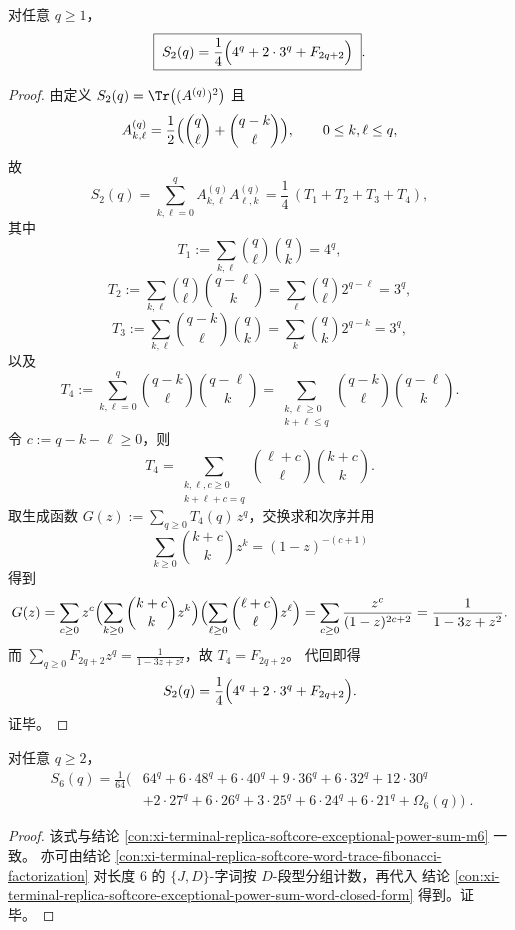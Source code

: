 \begin{corollary}[例外谱二次幂和的全闭式]\label{cor:xi-terminal-replica-softcore-exceptional-power-sum-m2-closed-form}
对任意 \(q\ge 1\)，
\[
\boxed{\;
S_2(q)=\frac14\Bigl(4^q+2\cdot3^q+F_{2q+2}\Bigr)\; }.
\]
\end{corollary}
\begin{proof}
由定义
\(
S_2(q)=\Tr\bigl((A^{(q)})^2\bigr)
\)
且
\[
A^{(q)}_{k,\ell}
=\frac12\Bigl(\binom{q}{\ell}+\binom{q-k}{\ell}\Bigr),
\qquad
0\le k,\ell\le q,
\]
故
\[
S_2(q)=\sum_{k,\ell=0}^{q}A^{(q)}_{k,\ell}A^{(q)}_{\ell,k}
=\frac14\,(T_1+T_2+T_3+T_4),
\]
其中
\[
T_1:=\sum_{k,\ell}\binom{q}{\ell}\binom{q}{k}=4^q,
\]
\[
T_2:=\sum_{k,\ell}\binom{q}{\ell}\binom{q-\ell}{k}
=\sum_{\ell}\binom{q}{\ell}2^{q-\ell}=3^q,
\]
\[
T_3:=\sum_{k,\ell}\binom{q-k}{\ell}\binom{q}{k}
=\sum_{k}\binom{q}{k}2^{q-k}=3^q,
\]
以及
\[
T_4:=\sum_{k,\ell=0}^{q}\binom{q-k}{\ell}\binom{q-\ell}{k}
=\sum_{\substack{k,\ell\ge0\\k+\ell\le q}}
\binom{q-k}{\ell}\binom{q-\ell}{k}.
\]
令 \(c:=q-k-\ell\ge0\)，则
\[
T_4
=\sum_{\substack{k,\ell,c\ge0\\k+\ell+c=q}}
\binom{\ell+c}{\ell}\binom{k+c}{k}.
\]
取生成函数 \(G(z):=\sum_{q\ge0}T_4(q)\,z^q\)，交换求和次序并用
\[
\sum_{k\ge0}\binom{k+c}{k}z^k=(1-z)^{-(c+1)}
\]
得到
\[
G(z)
=\sum_{c\ge0}z^c
\Bigl(\sum_{k\ge0}\binom{k+c}{k}z^k\Bigr)
\Bigl(\sum_{\ell\ge0}\binom{\ell+c}{\ell}z^\ell\Bigr)
=\sum_{c\ge0}\frac{z^c}{(1-z)^{2c+2}}
=\frac1{1-3z+z^2}.
\]
而
\(
\sum_{q\ge0}F_{2q+2}z^q=\frac1{1-3z+z^2}
\)，故 \(T_4=F_{2q+2}\)。
代回即得
\[
S_2(q)=\frac14\Bigl(4^q+2\cdot3^q+F_{2q+2}\Bigr).
\]
证毕。
\end{proof}

\begin{conclusion}[六次幂和的全指数展开]\label{con:xi-terminal-replica-softcore-exceptional-power-sum-m6-word-expanded}
对任意 \(q\ge 2\)，
\[
\boxed{\;
\begin{aligned}
S_6(q)=\frac1{64}\Big(
&64^{q}
+6\cdot 48^{q}
+6\cdot 40^{q}
+9\cdot 36^{q}
+6\cdot 32^{q}
+12\cdot 30^{q}\\
&+2\cdot 27^{q}
+6\cdot 26^{q}
+3\cdot 25^{q}
+6\cdot 24^{q}
+6\cdot 21^{q}
+\Omega_6(q)
\Big)\; .
\end{aligned}
}
\]
\end{conclusion}
\begin{proof}
该式与结论 \ref{con:xi-terminal-replica-softcore-exceptional-power-sum-m6} 一致。
亦可由结论 \ref{con:xi-terminal-replica-softcore-word-trace-fibonacci-factorization}
对长度 \(6\) 的 \(\{J,D\}\)-字词按 \(D\)-段型分组计数，再代入
结论 \ref{con:xi-terminal-replica-softcore-exceptional-power-sum-word-closed-form} 得到。证毕。
\end{proof}


